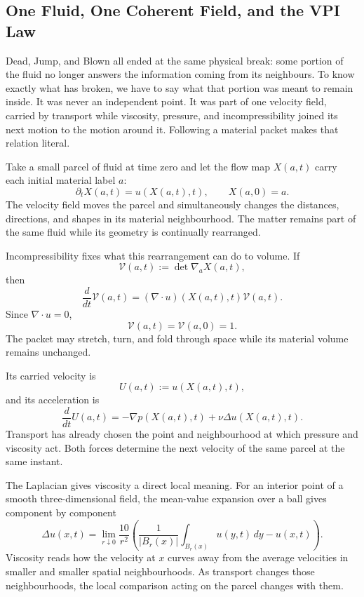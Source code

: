 \subsection{One Fluid, One Coherent Field, and the VPI Law}\label{sub:OneFluidOneCoherentFieldAndTheVPILaw}

Dead, Jump, and Blown all ended at the same physical break: some portion of the fluid no longer answers the information coming from its neighbours.
To know exactly what has broken, we have to say what that portion was meant to remain inside.
It was never an independent point.
It was part of one velocity field, carried by transport while viscosity, pressure, and incompressibility joined its next motion to the motion around it.
Following a material packet makes that relation literal.

Take a small parcel of fluid at time zero and let the flow map \(X(a,t)\) carry each initial material label \(a\):
\[
  \partial_tX(a,t)=u(X(a,t),t),
  \qquad
  X(a,0)=a.
\]
The velocity field moves the parcel and simultaneously changes the distances, directions, and shapes in its material neighbourhood.
The matter remains part of the same fluid while its geometry is continually rearranged.

Incompressibility fixes what this rearrangement can do to volume.
If
\[
  \mathcal V(a,t):=\det\nabla_aX(a,t),
\]
then
\[
  \frac{d}{dt}\mathcal V(a,t)
  =
  (\nabla\cdot u)(X(a,t),t)\mathcal V(a,t).
\]
Since \(\nabla\cdot u=0\),
\[
  \mathcal V(a,t)=\mathcal V(a,0)=1.
\]
The packet may stretch, turn, and fold through space while its material volume remains unchanged.

Its carried velocity is
\[
  U(a,t):=u(X(a,t),t),
\]
and its acceleration is
\[
  \frac{d}{dt}U(a,t)
  =
  -\nabla p(X(a,t),t)
  +
  \nu\Delta u(X(a,t),t).
\]
Transport has already chosen the point and neighbourhood at which pressure and viscosity act.
Both forces determine the next velocity of the same parcel at the same instant.

The Laplacian gives viscosity a direct local meaning.
For an interior point of a smooth three-dimensional field, the mean-value expansion over a ball gives component by component
\[
  \Delta u(x,t)
  =
  \lim_{r\downarrow0}
  \frac{10}{r^2}
  \left(
    \frac{1}{|B_r(x)|}
    \int_{B_r(x)}u(y,t)\,dy
    -
    u(x,t)
  \right).
\]
Viscosity reads how the velocity at \(x\) curves away from the average velocities in smaller and smaller spatial neighbourhoods.
As transport changes those neighbourhoods, the local comparison acting on the parcel changes with them.

